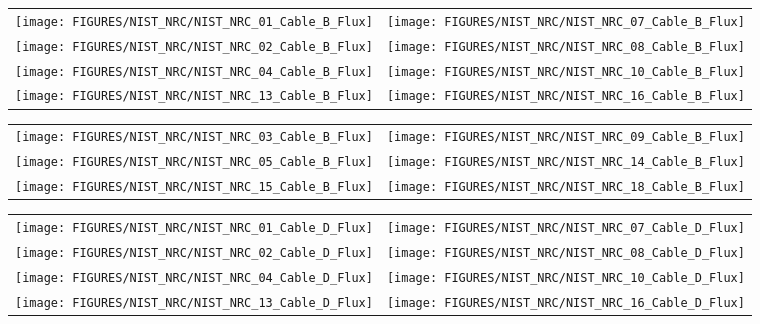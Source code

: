 \begin{figure}[p]
\begin{tabular*}{\textwidth}{l@{\extracolsep{\fill}}r}
\texttt{[image: FIGURES/NIST\_NRC/NIST\_NRC\_01\_Cable\_B\_Flux]} &
\texttt{[image: FIGURES/NIST\_NRC/NIST\_NRC\_07\_Cable\_B\_Flux]} \\
\texttt{[image: FIGURES/NIST\_NRC/NIST\_NRC\_02\_Cable\_B\_Flux]} &
\texttt{[image: FIGURES/NIST\_NRC/NIST\_NRC\_08\_Cable\_B\_Flux]} \\
\texttt{[image: FIGURES/NIST\_NRC/NIST\_NRC\_04\_Cable\_B\_Flux]} &
\texttt{[image: FIGURES/NIST\_NRC/NIST\_NRC\_10\_Cable\_B\_Flux]} \\
\texttt{[image: FIGURES/NIST\_NRC/NIST\_NRC\_13\_Cable\_B\_Flux]} &
\texttt{[image: FIGURES/NIST\_NRC/NIST\_NRC\_16\_Cable\_B\_Flux]}
\end{tabular*}
\label{NIST_NRC_Cable_B_Flux_Closed}
\end{figure}

\begin{figure}[p]
\begin{tabular*}{\textwidth}{l@{\extracolsep{\fill}}r}
\texttt{[image: FIGURES/NIST\_NRC/NIST\_NRC\_03\_Cable\_B\_Flux]} &
\texttt{[image: FIGURES/NIST\_NRC/NIST\_NRC\_09\_Cable\_B\_Flux]} \\
\texttt{[image: FIGURES/NIST\_NRC/NIST\_NRC\_05\_Cable\_B\_Flux]} &
\texttt{[image: FIGURES/NIST\_NRC/NIST\_NRC\_14\_Cable\_B\_Flux]} \\
\texttt{[image: FIGURES/NIST\_NRC/NIST\_NRC\_15\_Cable\_B\_Flux]} &
\texttt{[image: FIGURES/NIST\_NRC/NIST\_NRC\_18\_Cable\_B\_Flux]}
\end{tabular*}
\label{NIST_NRC_Cable_B_Flux_Open}
\end{figure}

\begin{figure}[p]
\begin{tabular*}{\textwidth}{l@{\extracolsep{\fill}}r}
\texttt{[image: FIGURES/NIST\_NRC/NIST\_NRC\_01\_Cable\_D\_Flux]} &
\texttt{[image: FIGURES/NIST\_NRC/NIST\_NRC\_07\_Cable\_D\_Flux]} \\
\texttt{[image: FIGURES/NIST\_NRC/NIST\_NRC\_02\_Cable\_D\_Flux]} &
\texttt{[image: FIGURES/NIST\_NRC/NIST\_NRC\_08\_Cable\_D\_Flux]} \\
\texttt{[image: FIGURES/NIST\_NRC/NIST\_NRC\_04\_Cable\_D\_Flux]} &
\texttt{[image: FIGURES/NIST\_NRC/NIST\_NRC\_10\_Cable\_D\_Flux]} \\
\texttt{[image: FIGURES/NIST\_NRC/NIST\_NRC\_13\_Cable\_D\_Flux]} &
\texttt{[image: FIGURES/NIST\_NRC/NIST\_NRC\_16\_Cable\_D\_Flux]}
\end{tabular*}
\label{NIST_NRC_Cable_D_Flux_Closed}
\end{figure}


